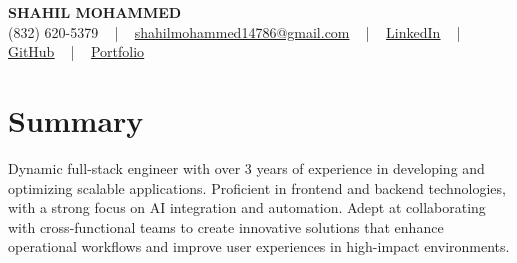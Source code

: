 \documentclass[letterpaper,10pt]{article}
\begin{document}
\begin{center}
    {\fontsize{14pt}{12pt}\selectfont \textbf{\MakeUppercase{Shahil Mohammed}}}\\ \vspace{2pt}
    \fontsize{10pt}{12pt}\selectfont (832) 620-5379 ~ | ~ \href{mailto:shahilmohammed14786@gmail.com}{shahilmohammed14786@gmail.com} ~ | ~  
    \href{https://www.linkedin.com/in/shahil-mohammed-9652931a1/}{\color{blue}\underline{LinkedIn}}  ~ | ~ 
    \href{https://github.com/freakbeast14}{\color{blue}\underline{GitHub}} ~ | ~ 
    \href{https://shahil-mohammed.netlify.app/}{\color{blue}\underline{Portfolio}}
    \vspace{-8pt}
\end{center}

\section{Summary}
\vspace{-2pt}\fontsize{8pt}{9pt}\selectfont
Dynamic full-stack engineer with over 3 years of experience in developing and optimizing scalable applications. Proficient in frontend and backend technologies, with a strong focus on AI integration and automation. Adept at collaborating with cross-functional teams to create innovative solutions that enhance operational workflows and improve user experiences in high-impact environments.

\vspace{-2pt}
\end{document}
